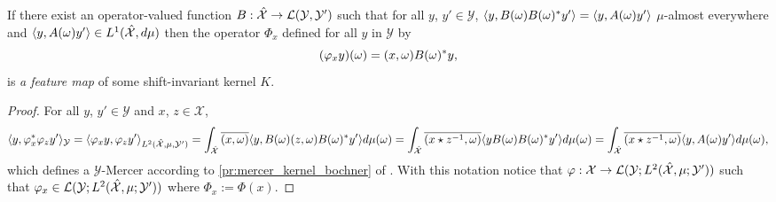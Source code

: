 \begin{proposition}\label{pr:fourier_feature_map}
If there exist an operator-valued function $B:\hat{\mathcal{X}}\to\mathcal{L}(\mathcal{Y},\mathcal{Y}')$ such that for all $y$, $y'\in\mathcal{Y}$, $\langle y, B(\omega)B(\omega)^*y'\rangle=\langle y, A(\omega)y'\rangle$ $\mu$-almost everywhere and $\langle y, A(\omega)y'\rangle\in L^1(\hat{\mathcal{X}},d\mu)$ then the operator $\Phi_x$ defined for all $y$ in $\mathcal{Y}$ by
\begin{dmath}
\label{eq:feature_shiftinv_map}
(\Phi_x y)(\omega)=\pairing{x,\omega}B(\omega)^*y,
\end{dmath}
is \emph{a feature map} of some shift-invariant kernel $K$.
\end{proposition}
\begin{proof}
For all $y$, $y'\in \mathcal{Y}$ and $x$, $z\in\mathcal{X}$,
\begin{dmath*}
\inner{y, \Phi_x^*\Phi_z y'}_{\mathcal{Y}} = \inner{\Phi_x y, \Phi_z y'}_{L^2(\dual{\mathcal{X}},\mu,\mathcal{Y}')} \\
= \int_{\dual{\mathcal{X}}}\conj{\pairing{x,\omega}}\inner{y, B(\omega)\pairing{z,\omega}B(\omega)^\adjoint y'}d\mu(\omega) \\
= \int_{\dual{\mathcal{X}}}\conj{\pairing{x \groupop \myinv{z},\omega}}\inner{y B(\omega)B(\omega)^\adjoint y'}d\mu(\omega) \\
= \int_{\dual{\mathcal{X}}}\conj{\pairing{x \groupop \inv{z},\omega}}\inner{y,A(\omega)y'}d\mu(\omega),
\end{dmath*}
which defines a $\mathcal{Y}$-Mercer according to \cref{pr:mercer_kernel_bochner} of \citet{Carmeli2010}. With this notation notice that $\Phi: \mathcal{X} \to \mathcal{L}(\mathcal{Y}; L^2(\dual{\mathcal{X}}, \mu; \mathcal{Y}'))$ such that $\Phi_x\in \mathcal{L}(\mathcal{Y}; L^2(\dual{\mathcal{X}}, \mu; \mathcal{Y}'))$ where $\Phi_x:=\Phi(x)$.
\end{proof}

